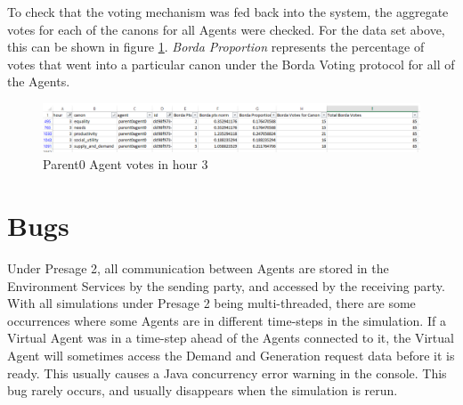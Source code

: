 To check that the voting mechanism was fed back into the system, the aggregate votes for each of the canons for all Agents were checked. For the data set above, this can be shown in figure \ref{fig:AgentVotes}. \textit{Borda Proportion} represents the percentage of votes that went into a particular canon under the Borda Voting protocol for all of the Agents.

\begin{figure}[h!]
	\centering
	\includegraphics[scale=0.34]{Images/test-allocation4.png}
	\caption{Parent0 Agent votes in hour 3}
	\label{fig:AgentVotes}
\end{figure}

\section*{Bugs}
Under Presage 2, all communication between Agents are stored in the Environment Services by the sending party, and accessed by the receiving party. With all simulations under Presage 2 being multi-threaded, there are some occurrences where some Agents are in different time-steps in the simulation. If a Virtual Agent was in a time-step ahead of the Agents connected to it, the Virtual Agent will sometimes access the Demand and Generation request data before it is ready. This usually causes a Java concurrency error warning in the console. This bug rarely occurs, and usually disappears when the simulation is rerun.

